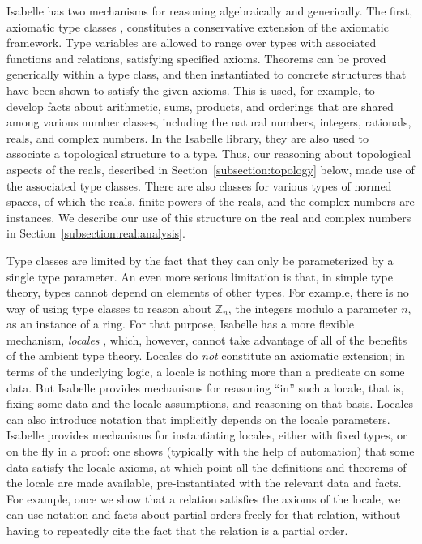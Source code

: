 \documentclass{svjour3}
\newcommand{\ZZ}{\mathbb{Z}}
\begin{document}
Isabelle has two mechanisms for reasoning algebraically and generically. The first, axiomatic type classes \cite{wenzel:97}, constitutes a conservative extension of the axiomatic framework. Type variables are allowed to range over types with associated functions and relations, satisfying specified axioms. Theorems can be proved generically within a type class, and then instantiated to concrete structures that have been shown to satisfy the given axioms. This is used, for example, to develop facts about arithmetic, sums, products, and orderings that are shared among various number classes, including the natural numbers, integers, rationals, reals, and complex numbers. In the Isabelle library, they are also used to associate a topological structure to a type. Thus, our reasoning about topological aspects of the reals, described in Section~\ref{subsection:topology} below, made use of the associated type classes. There are also classes for various types of normed spaces, of which the reals, finite powers of the reals, and the complex numbers are instances. We describe our use of this structure on the real and complex numbers in Section~\ref{subsection:real:analysis}.

Type classes are limited by the fact that they can only be parameterized by a single type parameter. An even more serious limitation is that, in simple type theory, types cannot depend on elements of other types. For example, there is no way of using type classes to reason about $\ZZ_n$, the integers modulo a parameter $n$, as an instance of a ring. For that purpose, Isabelle has a more flexible mechanism, \emph{locales} \cite{ballarin:06}, which, however, cannot take advantage of all of the benefits of the ambient type theory. Locales do \emph{not} constitute an axiomatic extension; in terms of the underlying logic, a locale is nothing more than a predicate on some data. But Isabelle provides mechanisms for reasoning ``in'' such a locale, that is, fixing some data and the locale assumptions, and reasoning on that basis. Locales can also introduce notation that implicitly depends on the locale parameters. Isabelle provides mechanisms for instantiating locales, either with fixed types, or on the fly in a proof: one shows (typically with the help of automation) that some data satisfy the locale axioms, at which point all the definitions and theorems of the locale are made available, pre-instantiated with the relevant data and facts. For example, once we show that a relation satisfies the axioms of the  locale, we can use notation and facts about partial orders freely for that relation, without having to repeatedly cite the fact that the relation is a partial order.
\end{document}
